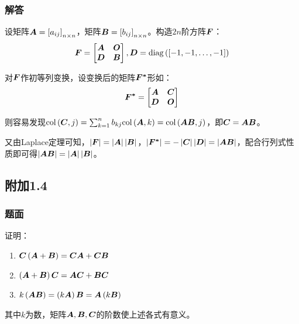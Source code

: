 \documentclass{beamer}
\begin{document}
\begin{frame}
\frametitle{解答}

设矩阵\(\mata=\mat{a_{ij}}_{n\times n}\)，矩阵\(\matb=\mat{b_{ij}}_{n\times n}\)。构造\(2n\)阶方阵\(\matf\)：
\begin{equation*}
    \matf=
    \begin{bmatrix}
        \mata & \mato \\\matd&\matb
    \end{bmatrix},\matd=\diag{\mat{-1,-1,\dots,-1}}
\end{equation*}

对\(\matf\)作初等列变换，设变换后的矩阵\(\matfstar\)形如：
\begin{equation*}
    \matfstar=\begin{bmatrix}\mata&\matc\\\matd&\mato\end{bmatrix}
\end{equation*}

则容易发现\(\col{\matc}{j}=\sum_{k=1}^nb_{kj}\col{\mata}{k}=\col{\mata\matb}{j}\)，即\(\matc=\mata\matb\)。

又由Laplace定理可知，\(\abs{\matf}=\abs{\mata}\abs{\matb}\)，\(\abs{\matfstar}=-\abs{\matc}\abs{\matd}=\abs{\mata\matb}\)，配合行列式性质即可得\(\abs{\mata\matb}=\abs{\mata}\abs{\matb}\)。

\end{frame}

\subsection*{附加1.4}

\begin{frame}
\frametitle{题面}

    证明：
    \begin{enumerate}
        \item \(\matc\mypar{\mata+\matb}=\matc\mata+\matc\matb\)
        \item \(\mypar{\mata+\matb}\matc=\mata\matc+\matb\matc\)
        \item \(k\mypar{\mata\matb}=\mypar{k\mata}\matb=\mata\mypar{k\matb}\)
    \end{enumerate}
    其中\(k\)为数，矩阵\(\mata,\matb,\matc\)的阶数使上述各式有意义。

\end{frame}
\end{document}
